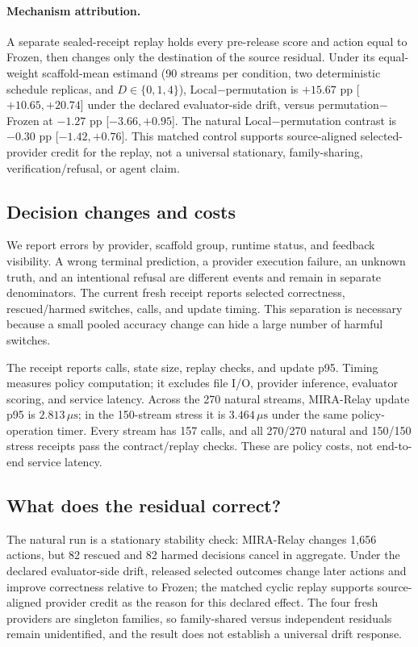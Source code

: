 \documentclass[sigconf,anonymous]{aamas}
\begin{document}
\paragraph{Mechanism attribution.} A separate sealed-receipt replay holds every pre-release score and action equal to Frozen, then changes only the destination of the source residual. Under its equal-weight scaffold-mean estimand (90 streams per condition, two deterministic schedule replicas, and $D\in\{0,1,4\}$), Local$-$permutation is $+15.67$ pp [$+10.65,+20.74$] under the declared evaluator-side drift, versus permutation$-$Frozen at $-1.27$ pp [$-3.66,+0.95$]. The natural Local$-$permutation contrast is $-0.30$ pp [$-1.42,+0.76$]. This matched control supports source-aligned selected-provider credit for the replay, not a universal stationary, family-sharing, verification/refusal, or agent claim.

\subsection{Decision changes and costs}
We report errors by provider, scaffold group, runtime status, and feedback visibility. A wrong terminal prediction, a provider execution failure, an unknown truth, and an intentional refusal are different events and remain in separate denominators. The current fresh receipt reports selected correctness, rescued/harmed switches, calls, and update timing. This separation is necessary because a small pooled accuracy change can hide a large number of harmful switches.

The receipt reports calls, state size, replay checks, and update p95. Timing measures policy computation; it excludes file I/O, provider inference, evaluator scoring, and service latency. Across the 270 natural streams, MIRA-Relay update p95 is $2.813\,\mu\mathrm{s}$; in the 150-stream stress it is $3.464\,\mu\mathrm{s}$ under the same policy-operation timer. Every stream has 157 calls, and all 270/270 natural and 150/150 stress receipts pass the contract/replay checks. These are policy costs, not end-to-end service latency.

\subsection{What does the residual correct?}
The natural run is a stationary stability check: MIRA-Relay changes 1,656 actions, but 82 rescued and 82 harmed decisions cancel in aggregate. Under the declared evaluator-side drift, released selected outcomes change later actions and improve correctness relative to Frozen; the matched cyclic replay supports source-aligned provider credit as the reason for this declared effect. The four fresh providers are singleton families, so family-shared versus independent residuals remain unidentified, and the result does not establish a universal drift response.
\end{document}
